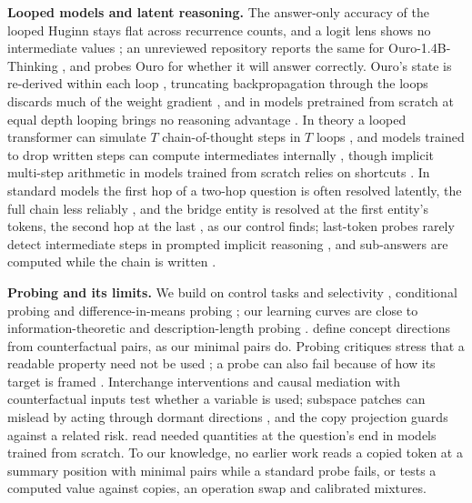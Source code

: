 \documentclass{article}
\begin{document}
\textbf{Looped models and latent reasoning.} The answer-only accuracy of the looped Huginn \citep{geiping2025} stays flat across recurrence counts, and a logit lens shows no intermediate values \citep{lu2025}; an unreviewed repository reports the same for Ouro-1.4B-Thinking \citep{mildrgb2026}, and \citet{kirin2026} probes Ouro for whether it will answer correctly. Ouro's state is re-derived within each loop \citep{wangreid2026,huang2026partii}, truncating backpropagation through the loops discards much of the weight gradient \citep{shalevmerin2026lost}, and in models pretrained from scratch at equal depth looping brings no reasoning advantage \citep{schwethelm2026a}. In theory a looped transformer can simulate $T$ chain-of-thought steps in $T$ loops \citep{saunshi2025reasoning}, and models trained to drop written steps can compute intermediates internally \citep{deng2024explicit,hao2025training}, though implicit multi-step arithmetic in models trained from scratch relies on shortcuts \citep{lin2025}. In standard models the first hop of a two-hop question is often resolved latently, the full chain less reliably \citep{yang2024latently,biran2024hopping}, and the bridge entity is resolved at the first entity's tokens, the second hop at the last \citep{biran2024hopping}, as our control finds; last-token probes rarely detect intermediate steps in prompted implicit reasoning \citep{yu2024}, and sub-answers are computed while the chain is written \citep{kudo2026}.

\textbf{Probing and its limits.} We build on control tasks and selectivity \citep{hewitt2019}, conditional probing \citep{hewitt2021conditional} and difference-in-means probing \citep{marks2023}; our learning curves are close to information-theoretic and description-length probing \citep{voita2020mdl,pimentel2020information}. \citet{park2024} define concept directions from counterfactual pairs, as our minimal pairs do. Probing critiques \citep{belinkov2022probing} stress that a readable property need not be used \citep{ravichander2021probing,elazar2021amnesic}; a probe can also fail because of how its target is framed \citep{nanda2023emergent}. Interchange interventions \citep{geiger2021causal,geiger2024finding} and causal mediation with counterfactual inputs \citep{vig2020investigating,stolfo2023,hanna2023greaterthan} test whether a variable is used; subspace patches can mislead by acting through dormant directions \citep{makelov2023}, and the copy projection guards against a related risk. \citet{ye2024} read needed quantities at the question's end in models trained from scratch. To our knowledge, no earlier work reads a copied token at a summary position with minimal pairs while a standard probe fails, or tests a computed value against copies, an operation swap and calibrated mixtures.
\end{document}
